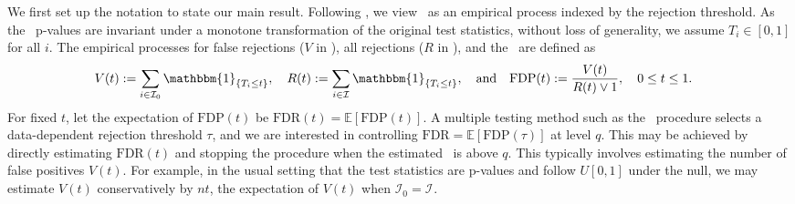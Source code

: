 \documentclass[a4paper,11pt]{article}
\theoremstyle{plain}
\theoremstyle{definition}
\def\EE{\mathbb{E}}
\def\calH{\mathcal{H}}
\def\calI{\mathcal{I}}
\def\1{\mathbbm{1}}
\theoremstyle{plain}
\newcommand{\testStatistics}[1]{{T_{#1}}}
\newcommand{\nickname}{{\text{RANC}}}
\newcommand{\hypothesisIndex}[1]{{\calI_{#1}}}
\newcommand{\nullHypothesisIndex}{{\calI_{0}}}
\newcommand{\nonNullHypothesisSet}{{\calH_{1}}}
\newcommand{\truePositive}{{S}}
\newcommand{\falsePositive}{{V}}
\newcommand{\totalPositive}{{R}}
\newcommand{\FDR}{\text{FDR}}
\newcommand{\FDP}{\text{FDP}}
\newcommand{\BH}{{\text{BH}}}
\begin{document}
We first set up the notation to state our main result. Following
\textcite{storey2004strong,genovese2004stochastic}, we
view \FDP~as an empirical process indexed by the rejection
threshold. As the \nickname~p-values are invariant under a monotone
transformation of the original test statistics, without loss of
generality, we assume $\testStatistics{i} \in [0,1]$ for all $i$. The
empirical processes for false rejections ($\falsePositive$ in
), all rejections ($\totalPositive$ in
), and the \FDP~are defined as
\begin{align*}
    \falsePositive(t) &:= \sum_{i \in \nullHypothesisIndex}
                        \1_{\{\testStatistics{i} \le t\}}, \quad
    \totalPositive(t) :=
    \sum_{i \in \hypothesisIndex{}} \1_{\{ \testStatistics{i} \le
t\}}, \quad
    \text{and} \quad
    \FDP(t) := \frac{V(t)}{R(t) \vee 1},\quad 0 \leq t \leq 1.
\end{align*}
For fixed $t$, let the expectation of $\FDP(t)$ be $\FDR(t) =
\EE\left[\FDP(t)\right]$. A multiple testing method such as the
\BH~procedure selects a data-dependent rejection threshold $\tau$, and
we are interested in controlling $\FDR = \EE[\FDP(\tau)]$ at level $q$. This
may be achieved by directly estimating $\FDR(t)$ and stopping the
procedure when the estimated \FDR~is above $q$. This typically
involves estimating the
number of false positives $\falsePositive(t)$. For example, in the
usual setting that the test statistics are p-values and follow $U[0,1]$ under the
null, we may estimate
$\falsePositive(t)$ conservatively by $nt$, the expectation of
$\falsePositive(t)$ when $\nullHypothesisIndex = \hypothesisIndex{}$.
\end{document}
